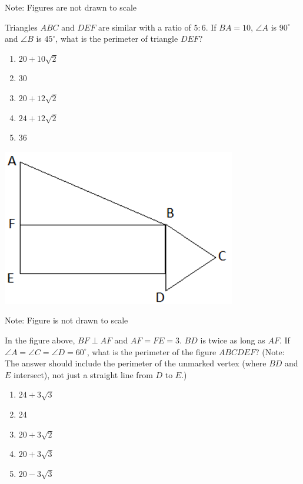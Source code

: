 \begin{multienumerate}
{Note: Figures are not drawn to scale

\bigskip
Triangles $ABC$ and $DEF$ are similar with a ratio of $5:6$. If $BA=10$, $\angle A$ is $90^\circ$ and $\angle B$ is $45^\circ$, what is the perimeter of triangle $DEF$?

\begin{enumerate}[label=(\Alph*)]
\item $20+10\sqrt2$
\item 30
\item $20+12\sqrt{2}$
\item $24+12\sqrt{2}$
\item 36
\end{enumerate}}
{\medium

\centerline{\includegraphics[scale=0.8]{23}}

Note: Figure is not drawn to scale

\bigskip
In the figure above, $BF\perp AF$ and $AF=FE=3$. $BD$ is twice as long as $AF$. If $\angle A=\angle C=\angle D=60^\circ$, what is the perimeter of the figure $ABCDEF$? (Note: The answer should include the perimeter of the unmarked vertex (where $BD$ and $E$ intersect), not just a straight line from $D$ to $E$.)

\begin{multicols}{2}
\begin{enumerate}[label=(\Alph*)]
\item $24+3\sqrt3$
\item 24
\item $20+3\sqrt2$
\item $20+3\sqrt3$
\item $20-3\sqrt3$
\end{enumerate}
\end{multicols}}

\vfill
\mitemxx{\advanced

}
\end{multienumerate}
